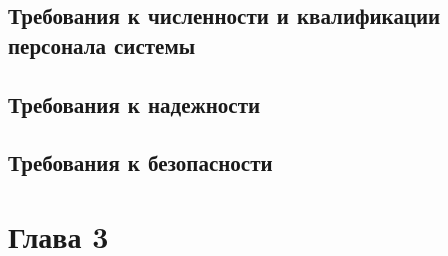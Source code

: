 \subsection{Требования к численности и квалификации персонала системы}
\subsection{Требования к надежности}
\subsection{Требования к безопасности}


\newpage\section{Глава 3}






\newpage{}
